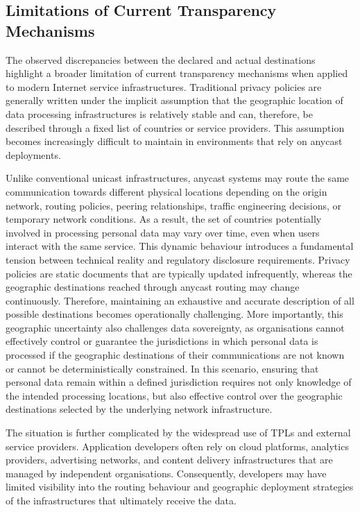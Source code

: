 \documentclass[
A4paper,                %
twoside,                %
openright,              %
chapterprefix=true,     %
12pt,                   %
headings=normal,        %
titlepage=on            %
]{book}
\begin{document}
\subsection{Limitations of Current Transparency Mechanisms}
\label{sc:anycast_experiments_transparency_limitations}

The observed discrepancies between the declared and actual destinations highlight a broader limitation of current transparency mechanisms when applied to modern Internet service infrastructures. Traditional privacy policies are generally written under the implicit assumption that the geographic location of data processing infrastructures is relatively stable and can, therefore, be described through a fixed list of countries or service providers. This assumption becomes increasingly difficult to maintain in environments that rely on anycast deployments.

Unlike conventional unicast infrastructures, anycast systems may route the same communication towards different physical locations depending on the origin network, routing policies, peering relationships, traffic engineering decisions, or temporary network conditions. As a result, the set of countries potentially involved in processing personal data may vary over time, even when users interact with the same service. This dynamic behaviour introduces a fundamental tension between technical reality and regulatory disclosure requirements. Privacy policies are static documents that are typically updated infrequently, whereas the geographic destinations reached through anycast routing may change continuously. Therefore, maintaining an exhaustive and accurate description of all possible destinations becomes operationally challenging. More importantly, this geographic uncertainty also challenges data sovereignty, as organisations cannot effectively control or guarantee the jurisdictions in which personal data is processed if the geographic destinations of their communications are not known or cannot be deterministically constrained. In this scenario, ensuring that personal data remain within a defined jurisdiction requires not only knowledge of the intended processing locations, but also effective control over the geographic destinations selected by the underlying network infrastructure.

The situation is further complicated by the widespread use of TPLs and external service providers. Application developers often rely on cloud platforms, analytics providers, advertising networks, and content delivery infrastructures that are managed by independent organisations. Consequently, developers may have limited visibility into the routing behaviour and geographic deployment strategies of the infrastructures that ultimately receive the data.
\end{document}
